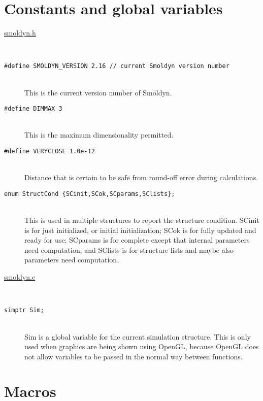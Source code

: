 \documentclass {book}
\begin{document}
\section{Constants and global variables}


\begin{description}

\item[\underline{smoldyn.h}]
\hfill \\

\item[\texttt{\#define SMOLDYN\_VERSION 2.16 // current Smoldyn version number}]
\hfill \\
This is the current version number of Smoldyn.
	
\item[\texttt{\#define DIMMAX 3}]
\hfill \\
This is the maximum dimensionality permitted.

\item[\texttt{\#define VERYCLOSE 1.0e-12}]
\hfill \\
Distance that is certain to be safe from round-off error during calculations.

\item[\texttt{enum StructCond \{SCinit,SCok,SCparams,SClists\};}]
\hfill \\
This is used in multiple structures to report the structure condition. SCinit is for just initialized, or initial initialization; SCok is for fully updated and ready for use; SCparams is for complete except that internal parameters need computation; and SClists is for structure lists and maybe also parameters need computation.

\item[\underline{smoldyn.c}]
\hfill \\

\item[\texttt{simptr Sim;}]
\hfill \\
Sim is a global variable for the current simulation structure. This is only used when graphics are being shown using OpenGL, because OpenGL does not allow variables to be passed in the normal way between functions.

\end{description}

\section{Macros}
\end{document}
